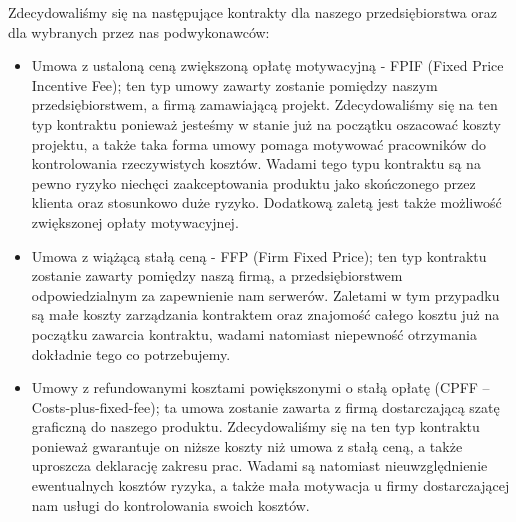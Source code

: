 Zdecydowaliśmy się na następujące kontrakty dla naszego przedsiębiorstwa oraz dla wybranych przez nas podwykonawców:
\begin{itemize}
\item Umowa z ustaloną ceną zwiększoną opłatę motywacyjną - FPIF (Fixed Price Incentive Fee); ten typ umowy zawarty zostanie pomiędzy naszym przedsiębiorstwem, a firmą zamawiającą projekt. Zdecydowaliśmy się na ten typ kontraktu ponieważ jesteśmy w stanie już na początku oszacować koszty projektu, a także taka forma umowy pomaga motywować pracowników do kontrolowania rzeczywistych kosztów. Wadami tego typu kontraktu są na pewno ryzyko niechęci zaakceptowania produktu jako skończonego przez klienta oraz stosunkowo duże ryzyko. Dodatkową zaletą jest także możliwość zwiększonej opłaty motywacyjnej.
\item Umowa z wiążącą stałą ceną - FFP (Firm Fixed Price); ten typ kontraktu zostanie zawarty pomiędzy naszą firmą, a przedsiębiorstwem odpowiedzialnym za zapewnienie nam serwerów. Zaletami w tym przypadku są małe koszty zarządzania kontraktem oraz znajomość całego kosztu już na początku zawarcia kontraktu, wadami natomiast niepewność otrzymania dokładnie tego co potrzebujemy.
\item Umowy z refundowanymi kosztami powiększonymi o stałą opłatę (CPFF – Costs-plus-fixed-fee);  ta umowa zostanie zawarta z firmą dostarczającą szatę graficzną do naszego produktu. Zdecydowaliśmy się na ten typ kontraktu ponieważ gwarantuje on niższe koszty niż umowa z stałą ceną, a także uproszcza deklarację zakresu prac. Wadami są natomiast nieuwzględnienie ewentualnych kosztów ryzyka, a także mała motywacja u firmy dostarczającej nam usługi do kontrolowania swoich kosztów.
\end{itemize}

